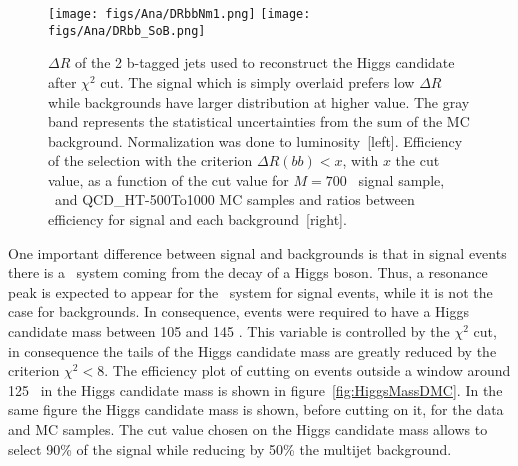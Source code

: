 \begin{figure}[!Hhtbp]
  \begin{center}
    \texttt{[image: figs/Ana/DRbbNm1.png]}
    \texttt{[image: figs/Ana/DRbb\_SoB.png]}
    \caption{$\Delta R$ of the 2 b-tagged jets used to reconstruct the Higgs candidate after $\chi^{2}$ cut. The signal which is simply overlaid prefers low $\Delta R$ while backgrounds have larger distribution at higher value. The gray band represents the statistical uncertainties from the sum of the MC background. Normalization was done to luminosity~[left]. Efficiency of the selection with the criterion $\Delta R(bb)<x$, with $x$ the cut value, as a function of the cut value for $M=700$ \GeVcc~signal sample, \ttbar~and QCD\_HT-500To1000 MC samples and ratios between efficiency for signal and each background~[right].}
    \label{fig:DRbb}
  \end{center}
\end{figure}

%
%
One important difference between signal and backgrounds is that in signal events there is a \bbbar~system coming from the decay of a Higgs boson. Thus, a resonance peak is expected to appear for the \bbbar~system for signal events, while it is not the case for backgrounds. In consequence, events were required to have a Higgs candidate mass between 105 and 145 \GeVcc. This variable is controlled by the $\chi^{2}$ cut, in consequence the tails of the Higgs candidate mass are greatly reduced by the criterion $\chi^{2}<8$. The efficiency plot of cutting on events outside a window around 125 \GeVcc~in the Higgs candidate mass is shown in figure~\ref{fig:HiggsMassDMC}. In the same figure the Higgs candidate mass is shown, before cutting on it, for the data and MC samples. The cut value chosen on the Higgs candidate mass allows to select 90\% of the signal while reducing by 50\% the multijet background. 

